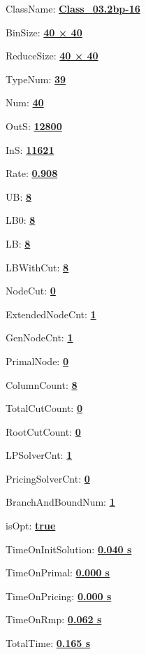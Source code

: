 \documentclass[11pt]{article}
\begin{document}
\pagestyle{empty}


ClassName: \underline{\textbf{Class_03.2bp-16}}
\par
BinSize: \underline{\textbf{40 × 40}}
\par
ReduceSize: \underline{\textbf{40 × 40}}
\par
TypeNum: \underline{\textbf{39}}
\par
Num: \underline{\textbf{40}}
\par
OutS: \underline{\textbf{12800}}
\par
InS: \underline{\textbf{11621}}
\par
Rate: \underline{\textbf{0.908}}
\par
UB: \underline{\textbf{8}}
\par
LB0: \underline{\textbf{8}}
\par
LB: \underline{\textbf{8}}
\par
LBWithCut: \underline{\textbf{8}}
\par
NodeCut: \underline{\textbf{0}}
\par
ExtendedNodeCnt: \underline{\textbf{1}}
\par
GenNodeCnt: \underline{\textbf{1}}
\par
PrimalNode: \underline{\textbf{0}}
\par
ColumnCount: \underline{\textbf{8}}
\par
TotalCutCount: \underline{\textbf{0}}
\par
RootCutCount: \underline{\textbf{0}}
\par
LPSolverCnt: \underline{\textbf{1}}
\par
PricingSolverCnt: \underline{\textbf{0}}
\par
BranchAndBoundNum: \underline{\textbf{1}}
\par
isOpt: \underline{\textbf{true}}
\par
TimeOnInitSolution: \underline{\textbf{0.040 s}}
\par
TimeOnPrimal: \underline{\textbf{0.000 s}}
\par
TimeOnPricing: \underline{\textbf{0.000 s}}
\par
TimeOnRmp: \underline{\textbf{0.062 s}}
\par
TotalTime: \underline{\textbf{0.165 s}}
\par
\newpage


\end{document}
